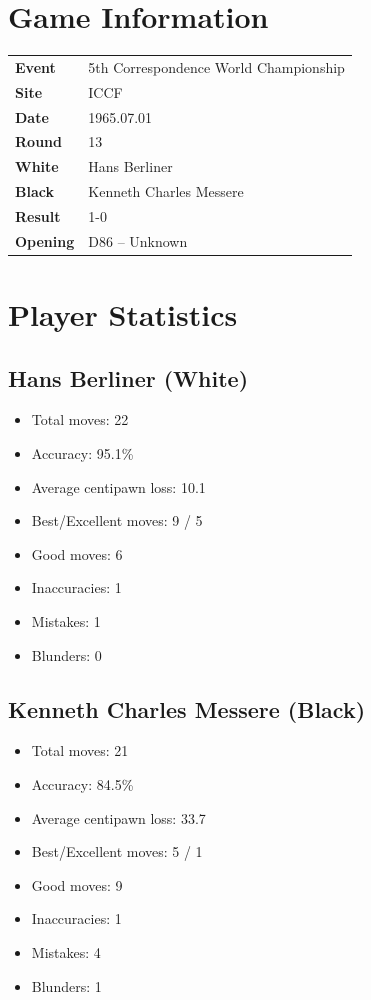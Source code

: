 \documentclass[11pt]{book}
\begin{document}
\section{Game Information}
\begin{tabular}{ll}
\textbf{Event} & 5th Correspondence World Championship \\
\textbf{Site} & ICCF \\
\textbf{Date} & 1965.07.01 \\
\textbf{Round} & 13 \\
\textbf{White} & Hans Berliner \\
\textbf{Black} & Kenneth Charles Messere \\
\textbf{Result} & 1-0 \\
\textbf{Opening} & D86 -- Unknown \\
\end{tabular}

\section{Player Statistics}

\subsection{Hans Berliner (White)}
\begin{itemize}
\item Total moves: 22
\item Accuracy: 95.1\%
\item Average centipawn loss: 10.1
\item Best/Excellent moves: 9 / 5
\item Good moves: 6
\item Inaccuracies: 1
\item Mistakes: 1
\item Blunders: 0
\end{itemize}

\subsection{Kenneth Charles Messere (Black)}
\begin{itemize}
\item Total moves: 21
\item Accuracy: 84.5\%
\item Average centipawn loss: 33.7
\item Best/Excellent moves: 5 / 1
\item Good moves: 9
\item Inaccuracies: 1
\item Mistakes: 4
\item Blunders: 1
\end{itemize}
\end{document}

